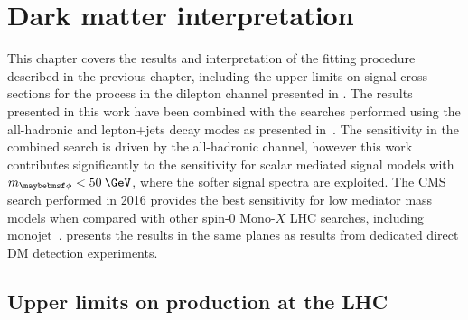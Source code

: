 \chapter{Dark matter interpretation}
\label{chap:results}

This chapter covers the results and interpretation of the fitting procedure described in the previous chapter, including the upper limits on signal cross sections for the \ttDM process in the dilepton channel presented in . The results presented in this work have been combined with the \ttDM searches performed using the all-hadronic and lepton+jets \ttbar decay modes as presented in~\cite{CMS-PAS-EXO-16-049}. The sensitivity in the combined search is driven by the all-hadronic channel, however this work contributes significantly to the sensitivity for scalar mediated signal models with $\mMed<50\:\GeV$, where the softer signal \MET spectra are exploited. The CMS \ttDM search performed in 2016 provides the best sensitivity for low mediator mass models when compared with other spin-0 $\text{Mono}$-$X$ LHC searches, including monojet~\cite{Sirunyan:2017jix}.  presents the results in the same planes as results from dedicated direct DM detection experiments. 

\section{Upper limits on \ttllDM production at the LHC}
\label{sec:UL}

